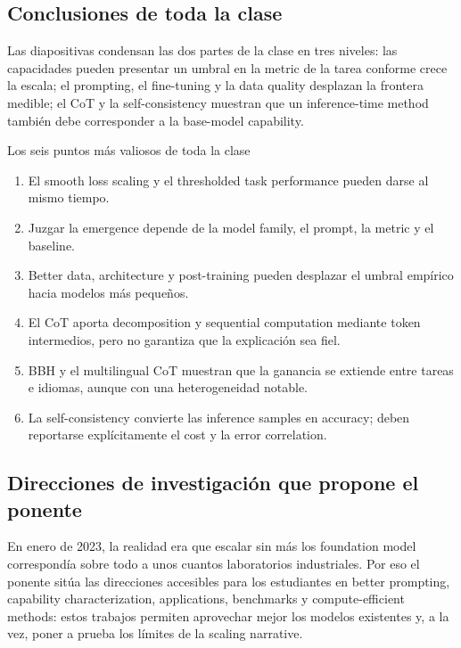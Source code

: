 \subsection{Conclusiones de toda la clase}

Las diapositivas condensan las dos partes de la clase en tres niveles: las capacidades pueden presentar un umbral en la metric de la tarea conforme crece la escala; el prompting, el fine-tuning y la data quality desplazan la frontera medible; el CoT y la self-consistency muestran que un inference-time method también debe corresponder a la base-model capability.


\begin{importantbox}{Los seis puntos más valiosos de toda la clase}
\begin{enumerate}
  \item El smooth loss scaling y el thresholded task performance pueden darse al mismo tiempo.
  \item Juzgar la emergence depende de la model family, el prompt, la metric y el baseline.
  \item Better data, architecture y post-training pueden desplazar el umbral empírico hacia modelos más pequeños.
  \item El CoT aporta decomposition y sequential computation mediante token intermedios, pero no garantiza que la explicación sea fiel.
  \item BBH y el multilingual CoT muestran que la ganancia se extiende entre tareas e idiomas, aunque con una heterogeneidad notable.
  \item La self-consistency convierte las inference samples en accuracy; deben reportarse explícitamente el cost y la error correlation.
\end{enumerate}
\end{importantbox}

\subsection{Direcciones de investigación que propone el ponente}

En enero de 2023, la realidad era que escalar sin más los foundation model correspondía sobre todo a unos cuantos laboratorios industriales. Por eso el ponente sitúa las direcciones accesibles para los estudiantes en better prompting, capability characterization, applications, benchmarks y compute-efficient methods: estos trabajos permiten aprovechar mejor los modelos existentes y, a la vez, poner a prueba los límites de la scaling narrative.

